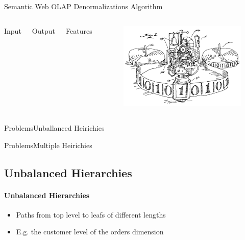 \begin{frame}{Semantic Web OLAP Denormalizations Algorithm}
\begin{columns}
    Input

    Output

    Features
    \begin{figure}
        \includegraphics[width=\textwidth]{images/turingMachine.png}
    \end{figure}    
\end{columns}
\end{frame}


\begin{frame}{Problems}{Unballanced Heirichies}

\end{frame}

\begin{frame}{Problems}{Multiple Heirichies}

\end{frame}


\subsection{Unbalanced Hierarchies} 
\begin{frame}{\alg}
\framesubtitle{Unbalanced Hierarchies}
\begin{itemize}
    \item Paths from top level to leafs of different lengths
    \item<3-> E.g. the customer level of the orders dimension
\end{itemize}
\begin{figure}[tb]
    \begin{center}
    \end{center}
\end{figure}
\end{frame}


